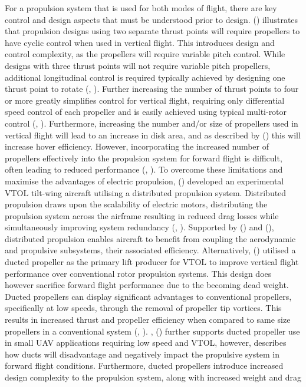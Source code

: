 For a propulsion system that is used for both modes of flight, there are key control and design aspects that must be understood prior to design. \citeauthor{cetinsoy2012design} (\citeyear{cetinsoy2012design}) illustrates that propulsion designs using two separate thrust points will require propellers to have cyclic control when used in vertical flight. This introduces design and control complexity, as the propellers will require variable pitch control. While designs with three thrust points will not require variable pitch propellers, additional longitudinal control is required typically achieved by designing one thrust point to rotate (\citeauthor{monterroso2018preliminary}, \citeyear{monterroso2018preliminary}). Further increasing the number of thrust points to four or more greatly simplifies control for vertical flight, requiring only differential speed control of each propeller and is easily achieved using typical multi-rotor control (\citeauthor{cetinsoy2012design}, \citeyear{cetinsoy2012design}). Furthermore, increasing the number and/or size of propellers used in vertical flight will lead to an increase in disk area, and as described by \citeauthor{maisel2000history} (\citeyear{maisel2000history}) this will increase hover efficiency. However, incorporating the increased number of propellers effectively into the propulsion system for forward flight is difficult, often leading to reduced performance (\citeauthor{maisel2000history}, \citeyear{maisel2000history}). To overcome these limitations and maximise the advantages of electric propulsion, \citeauthor{rothhaar2014nasa} (\citeyear{rothhaar2014nasa}) developed an experimental VTOL tilt-wing aircraft utilising a distributed propulsion system. Distributed propulsion draws upon the scalability of electric motors, distributing the propulsion system across the airframe resulting in reduced drag losses while simultaneously improving system redundancy (\citeauthor{rothhaar2014nasa}, \citeyear{rothhaar2014nasa}). Supported by \citeauthor{ma2020sizing} (\citeyear{ma2020sizing}) and \citeauthor{matrone2019performance} (\citeyear{matrone2019performance}), distributed propulsion enables aircraft to benefit from coupling the aerodynamic and propulsive subsystems, their associated efficiency. Alternatively, \citeauthor{RN8} (\citeyear{RN8}) utilised a ducted propeller as the primary lift producer for VTOL to improve vertical flight performance over conventional rotor propulsion systems. This design does however sacrifice forward flight performance due to the becoming dead weight. Ducted propellers can display significant advantages to conventional propellers, specifically at low speeds, through the removal of propeller tip vortices. This results in increased thrust and propeller efficiency when compared to same size propellers in a conventional system (\citeauthor{RyuMinhyoung2016AAot}, \citeyear{RyuMinhyoung2016AAot}). \citeauthor{yilmaz2015performance}, (\citeyear{yilmaz2015performance}) further supports ducted propeller use in small UAV applications requiring low speed and VTOL, however, describes how ducts will disadvantage and negatively impact the propulsive system in forward flight conditions. Furthermore, ducted propellers introduce increased design complexity to the propulsion system, along with increased weight and drag 